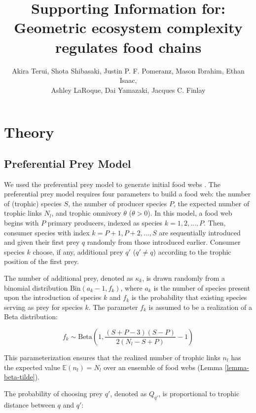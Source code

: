 \documentclass[11pt, class=article, crop=false]{standalone}
\title{Supporting Information for: \\Geometric ecosystem complexity regulates food chains}
\author{
Akira Terui, 
Shota Shibasaki,
Justin P. F. Pomeranz,
Mason Ibrahim,
Ethan Isaac,\\
Ashley LaRoque,
Dai Yamazaki,
Jacques C. Finlay
}
\date{} %
\theoremstyle{definition}
\begin{document}
\renewcommand{\theequation}{S\arabic{equation}}
\renewcommand{\thetable}{S\arabic{table}}
\renewcommand{\thefigure}{S\arabic{figure}}

\maketitle

\tableofcontents

\newpage

\section{Theory}

\subsection{Preferential Prey Model}

We used the preferential prey model to generate initial food webs \cite{johnson_trophic_2014}.
The preferential prey model requires four parameters to build a food web: the number of (trophic) species $S$, the number of producer species $P$, the expected number of trophic links $N_l$, and trophic omnivory $\theta$ ($\theta > 0$).
In this model, a food web begins with $P$ primary producers, indexed as species $k = 1, 2, ..., P$.
Then, consumer species with index $k = P + 1, P + 2, ..., S$ are sequentially introduced and given their first prey $q$ randomly from those introduced earlier.
Consumer species $k$ choose, if any, additional prey $q'$ ($q' \ne q$) according to the trophic position of the first prey.

The number of additional prey, denoted as $\kappa_k$, is drawn randomly from a binomial distribution $\mbox{Bin}(a_k - 1, f_k)$, where $a_k$ is the number of species present upon the introduction of species $k$ and $f_k$ is the probability that existing species serving as prey for species $k$.
The parameter $f_k$ is assumed to be a realization of a Beta distribution:

\begin{equation}
    f_k \sim \mbox{Beta}\left(1, \frac{(S + P - 3)(S - P)}{2(N_l - S + P)} - 1\right)
\end{equation}

This parameterization ensures that the realized number of trophic links $n_l$ has the expected value $\mathbb{E}(n_l) = N_l$ over an ensemble of food webs (Lemma \ref{lemma-beta-tilde}).

The probability of choosing prey $q'$, denoted as $Q_{q'}$, is proportional to trophic distance between $q$ and $q'$:
\end{document}
